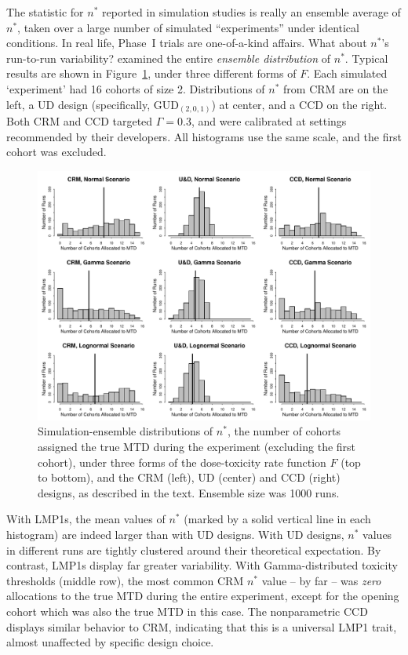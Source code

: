 The statistic for $n^*$ reported in simulation studies is really an ensemble average of $n^*$, taken over a large number of simulated ``experiments'' under identical conditions. In real life, Phase~I trials are one-of-a-kind affairs. What about $n^*$'s run-to-run variability? \citep{Oron:Hoff:smal:2013} examined the entire \emph{ensemble distribution} of $n^*$. Typical results are shown in Figure~\ref{fig:nstar}, under three different forms of $F$. Each simulated `experiment' had 16 cohorts of size 2. Distributions of $n^*$ from CRM are on the left, a UD design (specifically, GUD$_{(2,0,1)}$) at center, and a CCD on the right. Both CRM and CCD targeted $\Gamma=0.3$, and were calibrated at settings recommended by their developers. All histograms use the same scale, and the first cohort was excluded.

\begin{figure}[!ht]
\begin{center}
\includegraphics[scale=0.73]{nstar}
\end{center}
\caption{Simulation-ensemble distributions of $n^*$, the number of cohorts assigned the true MTD during the experiment  (excluding the first cohort), under three forms of the dose-toxicity rate function $F$ (top to bottom), and the CRM (left),  UD (center) and CCD (right) designs, as described in the text. Ensemble size was 1000 runs.}\label{fig:nstar}
\end{figure}

With LMP1s, the mean values of $n^*$ (marked by a solid vertical line in each histogram) are indeed larger than with UD designs. With UD designs, $n^*$ values in different runs are tightly clustered around their theoretical expectation. By contrast, LMP1s display far greater variability. With Gamma-distributed toxicity thresholds (middle row), the most common CRM $n^*$ value -- by far -- was \emph{zero} allocations to the true MTD during the entire experiment, except for the opening cohort which was also the true MTD in this case. The nonparametric CCD displays similar behavior to CRM, indicating that this is a universal LMP1 trait, almost unaffected by specific design choice.

